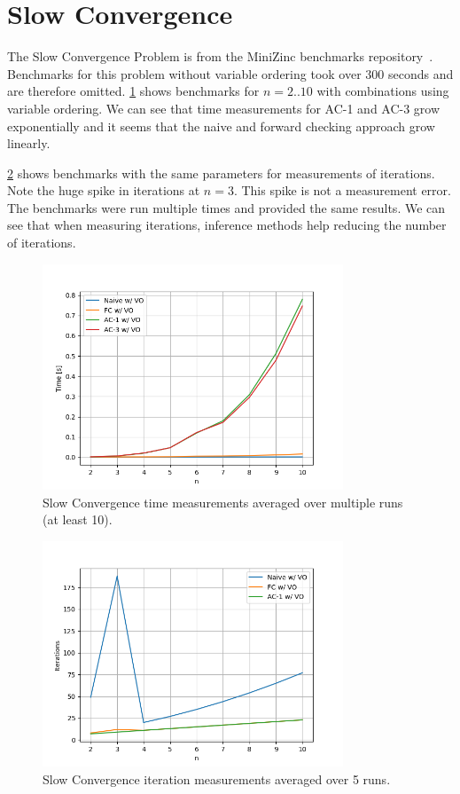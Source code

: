 \section{Slow Convergence}

The Slow Convergence Problem is from the MiniZinc benchmarks repository~\cite{minizinc_slow:2018}. Benchmarks for this problem without variable ordering took over 300 seconds and are therefore omitted. \cref{fig:slow:time-small} shows benchmarks for $n=2..10$ with combinations using variable ordering. We can see that time measurements for AC-1 and AC-3 grow exponentially and it seems that the naive and forward checking approach grow linearly.

\cref{fig:slow:iterations-small} shows benchmarks with the same parameters for measurements of iterations. Note the huge spike in iterations at $n = 3$. This spike is not a measurement error. The benchmarks were run multiple times and provided the same results. We can see that when measuring iterations, inference methods help reducing the number of iterations.

\begin{figure}[ht]
	\centering
	\includegraphics[width=0.8\textwidth]{./Problems/slow_convergence/plots/time_small.png}
	\caption{Slow Convergence time measurements averaged over multiple runs (at least 10).}
	\label{fig:slow:time-small}
\end{figure}

\begin{figure}[ht]
	\centering
	\includegraphics[width=0.8\textwidth]{./Problems/slow_convergence/plots/iterations_small.png}
	\caption{Slow Convergence iteration measurements averaged over 5 runs.}
	\label{fig:slow:iterations-small}
\end{figure}

